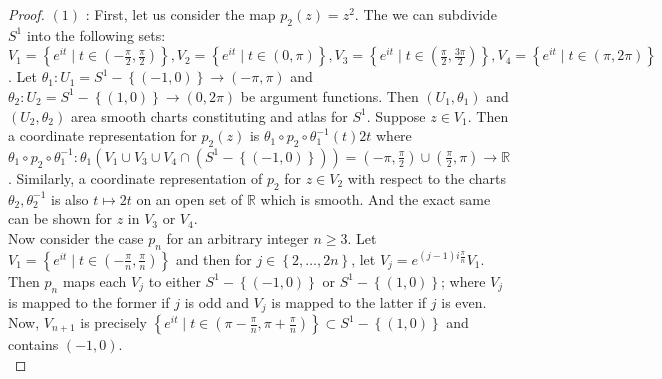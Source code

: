 \documentclass[reqno]{amsart}
\theoremstyle{plain}%
\theoremstyle{definition}
\theoremstyle{remark}
\begin{document}
    \begin{proof}
        $(1)$ : First, let us consider the map $p_2 (z) = z^2$. The
        we can subdivide $S^{1}$ into the following sets:
        $V_1 = \left\{ e^{it } \mid t\in \left( -\frac{\pi}{2}, \frac{\pi}{2} \right)  \right\} 
        ,V_2 = \left\{ e^{i t}  \mid  t \in \left( 0, \pi \right)  \right\} ,
        V_3 = \left\{ e^{i t}  \mid  t\in \left( \frac{\pi}{2}, \frac{3\pi}{2}
        \right)  \right\} ,
        V_4 = \left\{ e^{i t} \mid t \in \left( \pi, 2\pi \right)  \right\}$.
        Let $\theta_1  \colon U_1 = S^{1} - \left\{ \left( -1,0 \right)  \right\} \to 
        \left( - \pi, \pi \right) $ and
        $\theta_2  \colon U_2 = S^{1} - \left\{ \left( 1,0 \right)  \right\} \to 
        \left( 0, 2 \pi \right) $ be argument functions. Then
        $\left( U_1, \theta_1 \right)$ and $\left( U_2, \theta_2 \right) $ 
        area smooth charts constituting and atlas for $S^{1}$.
        Suppose $z \in V_1$. Then a coordinate representation for
        $p_2 (z)$ is $\theta_1 \circ p_2 \circ \theta_1^{-1} (t)
        2t  $ where $\theta_1 \circ p_2 \circ \theta_1^{-1}  \colon
        \theta_1 \left( V_1 \cup V_3 \cup V_4 \cap \left( 
        S^{1} - \left\{ \left( -1,0 \right)  \right\} \right)  \right) = 
        \left( -\pi , \frac{\pi}{2} \right) \cup
        \left( \frac{\pi}{2}, \pi \right) \to \mathbb{R}$. Similarly,
        a coordinate representation of $p_2$ for $z \in V_2$ with respect to
        the charts $\theta_2 , \theta_2^{-1}$ is also $t \mapsto 2t$ on an open
        set of $\mathbb{R}$ which is smooth. And the exact same can be shown
        for  $z$ in $V_3$ or $V_4$.\\
        \linebreak
        Now consider the case $p_n$ for an arbitrary integer $n\ge 3$.
        Let $V_1 = \left\{ e^{it } \mid t\in 
        \left( - \frac{\pi}{n}, \frac{\pi}{n} \right)  \right\} $ and then for
        $j \in \left\{ 2, \ldots, 2n \right\} $, let
        $V_j = e^{\left( j-1 \right) i \frac{\pi}{n}} V_1$. Then
        $p_n$ maps each $V_j$ to either $S^{1} - \left\{ \left( -1,0 \right)
        \right\} $ or
        $S^{1} - \left\{ \left( 1,0 \right)  \right\} $; where
        $V_j$ is mapped to the former if $j$ is odd and
        $V_j$ is mapped to the latter if $j$ is even. Now,
        $V_{n+1}$ is precisely $\left\{ e^{i t}  \mid 
        t \in \left( \pi - \frac{\pi}{n}, \pi + \frac{\pi}{n} \right) \right\}
        \subset S^{1} - \left\{ \left( 1,0 \right)  \right\} $ and
        contains $\left( -1,0 \right) $.\\

\end{proof}
\end{document}
